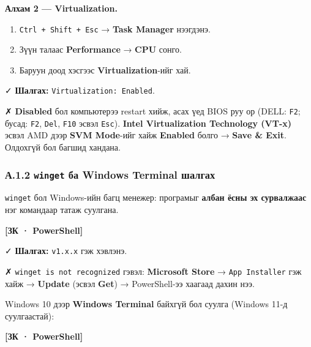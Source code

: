 \textbf{Алхам 2 --- Virtualization.}

\begin{enumerate}
\def\labelenumi{\arabic{enumi}.}
\tightlist
\item
  \texttt{Ctrl\ +\ Shift\ +\ Esc} → \textbf{Task Manager} нээгдэнэ.
\item
  Зүүн талаас \textbf{Performance} → \textbf{CPU} сонго.
\item
  Баруун доод хэсгээс \textbf{Virtualization}-ийг хай.
\end{enumerate}

✓ \textbf{Шалгах:} \texttt{Virtualization:\allowbreak{}\ Enabled}.

✗ \textbf{Disabled} бол компьютерээ restart хийж, асах үед BIOS руу ор (DELL: \texttt{F2}; бусад: \texttt{F2}, \texttt{Del}, \texttt{F10} эсвэл \texttt{Esc}). \textbf{Intel Virtualization Technology (VT-x)} эсвэл AMD дээр \textbf{SVM Mode}-ийг хайж \textbf{Enabled} болго → \textbf{Save \& Exit}. Олдохгүй бол багшид хандана.

\hypertarget{ux430.1.2-winget-ux431ux430-windows-terminal-ux448ux430ux43bux433ux430ux445}{%
\subsubsection{\texorpdfstring{А.1.2 \texttt{winget} ба Windows Terminal шалгах}{А.1.2 winget ба Windows Terminal шалгах}}\label{ux430.1.2-winget-ux431ux430-windows-terminal-ux448ux430ux43bux433ux430ux445}}

\texttt{winget} бол Windows-ийн багц менежер: програмыг \textbf{албан ёсны эх сурвалжаас} нэг командаар татаж суулгана.

\textbf{{[}ЗК · PowerShell{]}}

\begin{Shaded}
\begin{Highlighting}[]
\end{Highlighting}
\end{Shaded}

✓ \textbf{Шалгах:} \texttt{v1.x.x} гэж хэвлэнэ.

✗ \texttt{winget\ is\ not\ recognized} гэвэл: \textbf{Microsoft Store} → \texttt{App\ Installer} гэж хайж → \textbf{Update} (эсвэл \textbf{Get}) → PowerShell-ээ хаагаад дахин нээ.

Windows 10 дээр \textbf{Windows Terminal} байхгүй бол суулга (Windows 11-д суулгаастай):

\textbf{{[}ЗК · PowerShell{]}}

